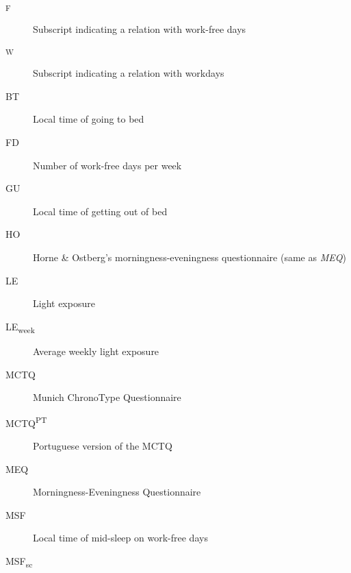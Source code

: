 \setlength{\absparsep}{12pt}
\begin{siglas}
\begin{description}
\item[\textsubscript{F}]
\hspace{20cm}

Subscript indicating a relation with work-free days
\item[\textsubscript{W}]
\hspace{20cm}

Subscript indicating a relation with workdays
\item[BT]
\hspace{20cm}

Local time of going to bed
\item[FD]
\hspace{20cm}

Number of work-free days per week
\item[GU]
\hspace{20cm}

Local time of getting out of bed
\item[HO]
\hspace{20cm}

Horne \& Ostberg's morningness-eveningness questionnaire (same as
\emph{MEQ})
\item[LE]
\hspace{20cm}

Light exposure
\item[LE\textsubscript{week}]
\hspace{20cm}

Average weekly light exposure
\item[MCTQ]
\hspace{20cm}

Munich ChronoType Questionnaire
\item[MCTQ\textsuperscript{PT}]
\hspace{20cm}

Portuguese version of the MCTQ
\item[MEQ]
\hspace{20cm}

Morningness-Eveningness Questionnaire
\item[MSF]
\hspace{20cm}

Local time of mid-sleep on work-free days
\item[MSF\textsubscript{sc}]
\hspace{20cm}


\end{description}
\end{siglas}
